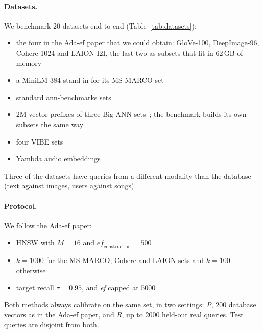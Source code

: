 \documentclass[sigconf, nonacm]{acmart}
\newcommand{\ef}{\textit{ef}}
\begin{document}
\paragraph{Datasets.}
We benchmark 20 datasets end to end (Table~\ref{tab:datasets}):
\begin{itemize}
\item the four in the Ada-ef paper that we could obtain: GloVe-100, DeepImage-96, Cohere-1024 and
  LAION-I2I, the last two as subsets that fit in 62\,GB of memory
\item a MiniLM-384 stand-in for its MS MARCO set
\item standard ann-benchmarks sets~\cite{aumuller2020annbenchmarks}
\item 2M-vector prefixes of three Big-ANN sets~\cite{simhadri2022bigann}; the benchmark builds its own
  subsets the same way
\item four VIBE sets~\cite{jaasaari2025vibe}
\item Yambda audio embeddings~\cite{ploshkin2025yambda}
\end{itemize}
Three of the datasets have queries from a different modality than the database (text against images,
users against songs).

\paragraph{Protocol.}
We follow the Ada-ef paper:
\begin{itemize}
\item HNSW with $M = 16$ and $\mathit{ef}_{\mathrm{construction}} = 500$
\item $k = 1000$ for the MS MARCO, Cohere and LAION sets and $k = 100$ otherwise
\item target recall $\tau = 0.95$, and \ef{} capped at 5000
\end{itemize}
Both methods always calibrate on the same set, in two settings: \emph{P}, 200 database vectors as in
the Ada-ef paper, and \emph{R}, up to 2000 held-out real queries. Test queries are disjoint from
both.
\end{document}
